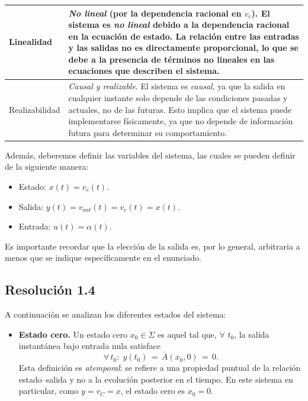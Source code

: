 \documentclass[
  11pt,
  letterpaper,
   addpoints,
   answers
  ]{exam}
\begin{document}
\begin{questions}
\begin{solution}
\begin{center}
\begin{tabular}{|p{3cm}|p{11cm}|}
\hline
Linealidad & \emph{No lineal} (por la dependencia racional en \(\dot v_c\)). El sistema es \emph{no lineal} debido a la dependencia racional en la ecuación de estado. La relación entre las entradas y las salidas no es directamente proporcional, lo que se debe a la presencia de términos no lineales en las ecuaciones que describen el sistema. \\
\hline
Realizabilidad & \emph{Causal y realizable}. El sistema es \emph{causal}, ya que la salida en cualquier instante solo depende de las condiciones pasadas y actuales, no de las futuras. Esto implica que el sistema puede implementarse físicamente, ya que no depende de información futura para determinar su comportamiento. \\
\hline
\end{tabular}
\end{center}



Además, deberemos definir las variables del sistema, las cuales se pueden definir de la siguiente manera:
\begin{itemize}
    \item Estado: \(x(t)=v_c(t)\).
    \item Salida: \(y(t)=v_{out}(t)=v_c(t)=x(t)\).
    \item Entrada: \(u(t)=\alpha(t)\).
\end{itemize}
Es importante recordar que la elección de la salida es, por lo general, arbitraria a menos que se indique específicamente en el enunciado.
\subsection*{Resolución 1.4}
A continuación se analizan los diferentes estados del sistema:

\begin{itemize}
  \item \textbf{Estado cero.} Un estado cero \(x_0 \in \Sigma\) es aquel tal que, $\forall$ \(t_0\), la salida instantánea bajo entrada nula satisface
  \begin{equation*}
    \forall\, t_0:\; y(t_0) \,=\, \overline{A}(x_0,0) \,=\, 0.
  \end{equation*}
  Esta definición es \emph{atemporal}: se refiere a una propiedad puntual de la relación estado–salida y no a la evolución posterior en el tiempo.
  En este sistema en particular, como \(y=v_C=x\), el estado cero es \(x_0 = 0\).


\end{itemize}
\end{solution}
\end{questions}
\end{document}
